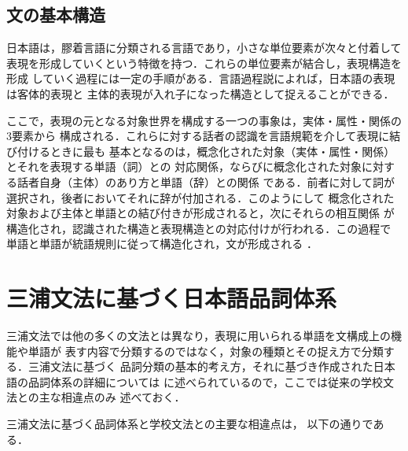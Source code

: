\documentclass[japanese]{jnlp_1.2}
\begin{document}
\subsection{文の基本構造}
日本語は，膠着言語に分類される言語であり，小さな単位要素が次々と付着して
表現を形成していくという特徴を持つ．これらの単位要素が結合し，表現構造を形成
していく過程には一定の手順がある．言語過程説によれば，日本語の表現は客体的表現と
主体的表現が入れ子になった構造として捉えることができる．

ここで，表現の元となる対象世界を構成する一つの事象は，実体・属性・関係の3要素から
構成される．これらに対する話者の認識を言語規範を介して表現に結び付けるときに最も
基本となるのは，概念化された対象（実体・属性・関係）とそれを表現する単語（詞）との
対応関係，ならびに概念化された対象に対する話者自身（主体）のあり方と単語（辞）との関係
である．前者に対して詞が選択され，後者においてそれに辞が付加される．このようにして
概念化された対象および主体と単語との結び付きが形成されると，次にそれらの相互関係
が構造化され，認識された構造と表現構造との対応付けが行われる．この過程で
単語と単語が統語規則に従って構造化され，文が形成される
\cite{池原他1990}
．

\section{三浦文法に基づく日本語品詞体系}
三浦文法では他の多くの文法とは異なり，表現に用いられる単語を文構成上の機能や単語が
表す内容で分類するのではなく，対象の種類とその捉え方で分類する．三浦文法に基づく
品詞分類の基本的考え方，それに基づき作成された日本語の品詞体系の詳細については
\cite{宮崎他1995}
に述べられているので，ここでは従来の学校文法との主な相違点のみ
述べておく．

三浦文法に基づく品詞体系と学校文法との主要な相違点は，
以下の通りである\cite{宮崎他1995}．
\end{document}
